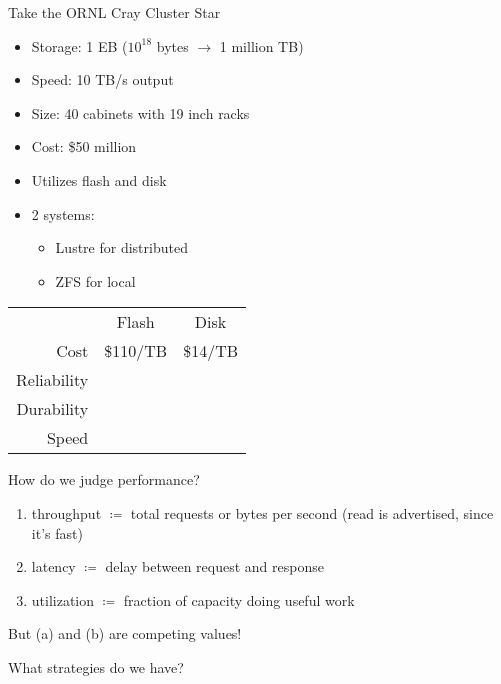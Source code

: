 \documentclass[../../lecture_notes.tex]{subfiles}
\begin{document}
Take the ORNL Cray Cluster Star

\begin{minipage}{0.5\linewidth}
\begin{itemize}
	\item Storage: 1 EB ($10^18$ bytes $\rightarrow$ 1 million TB)
	\item Speed: 10 TB/s output
	\item Size: 40 cabinets with 19 inch racks
	\item Cost: \$50 million
	\item Utilizes flash and disk
	\item 2 systems: 
		\begin{itemize}
			\item Lustre for distributed 
			\item ZFS for local
		\end{itemize}
\end{itemize}
\end{minipage}%
\hfill
\begin{minipage}{0.5\linewidth}
\begin{center}
\begin{tabular} { r | c | c | }
	\multicolumn{1}{c}{} & \multicolumn{1}{c}{Flash} & \multicolumn{1}{c}{Disk} \\
	\cline{2-3}
	Cost & \$110/TB & \$14/TB \\
	\cline{2-3}
	Reliability & & \checkmark \\
	\cline{2-3}
	Durability & & \checkmark \\
	\cline{2-3}
	Speed & \checkmark & \\
	\cline{2-3}
\end{tabular}
\end{center}
\end{minipage}


How do we judge performance?
\begin{enumerate}[ label=(\alph*), nosep]
	\item throughput $\coloneqq$ total requests or bytes per second (read is advertised, since it’s fast)
	\item latency $\coloneqq$ delay between request and response
	\item utilization $\coloneqq$ fraction of capacity doing useful work
\end{enumerate}

But (a) and (b) are competing values!

What strategies do we have?
\end{document}
